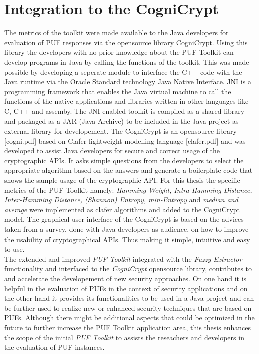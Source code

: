 \section{Integration to the CogniCrypt}
The metrics of the toolkit were made available to the Java developers for evaluation of PUF responses via the opensource library CogniCrypt. Using this library the developers with no prior knowledge about the PUF Toolkit can develop programs in Java by calling the functions of the toolkit. This was made possible by developing a seperate module to interface the C++ code with the Java runtime via the Oracle Standard technology Java Native Interface. JNI is a programming
framework that enables the Java virtual machine to call the functions of the native applications and libraries written in other languages like C, C++ and assemby. The JNI enabled toolkit is compiled as a shared library and packaged as a JAR (Java Archive) to be included in the Java project as external library for developement. The CogniCrypt is an opensource library [cogni.pdf] based on Clafer lightweight modelling language [clafer.pdf] and was developed to assist Java developers for secure and correct usage of the cryptographic APIs. It asks
simple questions from the developers to select the appropriate algorithm based on the answers and generate a boilerplate code that shows the sample usage of the cryptographic API. For this thesis the specific metrics of the PUF Toolkit namely: \emph{Hamming Weight, Intra-Hamming Distance, Inter-Hamming Distance, (Shannon) Entropy, min-Entropy} and \emph{median and average} were implemented as clafer algorithms and added to the CogniCrypt model. The graphical user interface of the
CogniCrypt is based on the advices taken from a survey, done with Java developers as audience, on how to improve the usability of cryptographical APIs. Thus making it simple, intuitive and easy to use.\\

The extended and improved \emph{PUF Toolkit} integrated with the \emph{Fuzzy Extractor} functionality and interfaced to the \emph{CogniCrypt} opensource library, contributes to and accelerate the developement of new security approaches. On one hand it is helpful in the evaluation of PUFs in the context of security applications and on the other hand it provides its functionalities to be used in a Java project and can be further used to realize new or enhanced security techniques that
are based on PUFs. Although there might be additional aspects that could be optimized in the future to further increase the PUF Toolkit application area, this thesis enhances the scope of the initial \emph{PUF Toolkit} to assists the reseachers and developers in the evaluation of PUF instances.

